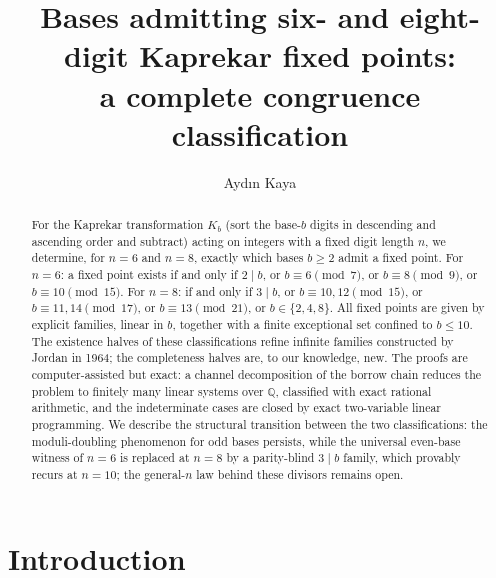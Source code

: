 \documentclass[11pt]{amsart}
\title[Bases admitting six- and eight-digit Kaprekar fixed points]{Bases admitting six- and eight-digit Kaprekar fixed points:\\ a complete congruence classification}
\author{Ayd{\i}n Kaya}
\theoremstyle{definition}
\begin{document}
\begin{abstract}
For the Kaprekar transformation $K_b$ (sort the base-$b$ digits in
descending and ascending order and subtract) acting on integers with a
fixed digit length $n$, we determine, for $n=6$ and $n=8$, exactly which
bases $b\ge 2$ admit a fixed point. For $n=6$: a fixed point exists if
and only if $2\mid b$, or $b\equiv 6 \pmod 7$, or $b\equiv 8 \pmod 9$,
or $b\equiv 10 \pmod{15}$. For $n=8$: if and only if $3\mid b$, or
$b\equiv 10,12\pmod{15}$, or $b\equiv 11,14\pmod{17}$, or
$b\equiv 13\pmod{21}$, or $b\in\{2,4,8\}$. All fixed points are given by
explicit families, linear in $b$, together with a finite exceptional set
confined to $b\le 10$. The existence halves of these classifications
refine infinite families constructed by Jordan in 1964; the
completeness halves are, to our knowledge, new. The proofs are
computer-assisted but exact: a
channel decomposition of the borrow chain reduces the problem to finitely
many linear systems over $\mathbb{Q}$, classified with exact rational
arithmetic, and the indeterminate cases are closed by exact
two-variable linear programming. We describe the structural transition
between the two classifications: the moduli-doubling phenomenon for odd
bases persists, while the universal even-base witness of $n=6$ is
replaced at $n=8$ by a parity-blind $3\mid b$ family, which provably
recurs at $n=10$; the general-$n$ law behind these divisors remains
open.
\end{abstract}

\maketitle

\section{Introduction}
\end{document}
